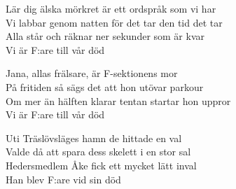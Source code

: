 \begin{vers}
Lär dig älska mörkret är ett ordspråk som vi har\\
Vi labbar genom natten för det tar den tid det tar\\
Alla står och räknar ner sekunder som är kvar\\ 
Vi är F:are till vår död
\end{vers}

\begin{vers}
Jana, allas frälsare, är F-sektionens mor\\
På fritiden så sägs det att hon utövar parkour\\
Om mer än hälften klarar tentan startar hon uppror\\
Vi är F:are till vår död \\
\end{vers}

\begin{vers}
Uti Träslövsläges hamn de hittade en val\\ 
Valde då att spara dess skelett i en stor sal\\
Hedersmedlem Åke fick ett mycket lätt inval\\
Han blev F:are vid sin död\\
\end{vers}

\fi

